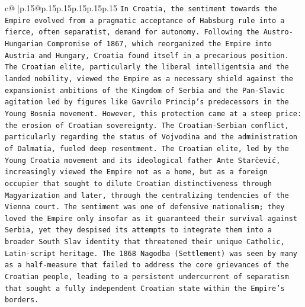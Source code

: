 \documentclass{article}
\begin{document}
{\begin{supertabular}{c@{$\;$}|p{.15\linewidth}@{}p{.15\linewidth}p{.15\linewidth}p{.15\linewidth}p{.15\linewidth}p{.15\linewidth}}
{{{\texttt{In Croatia, the sentiment towards the Empire evolved from a pragmatic acceptance of Habsburg rule into a fierce, often separatist, demand for autonomy. Following the Austro{-}Hungarian Compromise of 1867, which reorganized the Empire into Austria and Hungary, Croatia found itself in a precarious position. The Croatian elite, particularly the liberal intelligentsia and the landed nobility, viewed the Empire as a necessary shield against the expansionist ambitions of the Kingdom of Serbia and the Pan{-}Slavic agitation led by figures like Gavrilo Princip's predecessors in the Young Bosnia movement. However, this protection came at a steep price: the erosion of Croatian sovereignty. The Croatian{-}Serbian conflict, particularly regarding the status of Vojvodina and the administration of Dalmatia, fueled deep resentment. The Croatian elite, led by the Young Croatia movement and its ideological father Ante Starčević, increasingly viewed the Empire not as a home, but as a foreign occupier that sought to dilute Croatian distinctiveness through Magyarization and later, through the centralizing tendencies of the Vienna court. The sentiment was one of defensive nationalism; they loved the Empire only insofar as it guaranteed their survival against Serbia, yet they despised its attempts to integrate them into a broader South Slav identity that threatened their unique Catholic, Latin{-}script heritage. The 1868 Nagodba (Settlement) was seen by many as a half{-}measure that failed to address the core grievances of the Croatian people, leading to a persistent undercurrent of separatism that sought a fully independent Croatian state within the Empire's borders.} \\
\\ 
}}}
\end{supertabular}}
\end{document}

